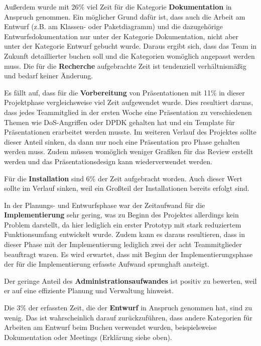 \documentclass[../review_2.tex]{subfiles}
\begin{document}
Außerdem wurde mit 26\% viel Zeit für die Kategorie \textbf{Dokumentation} in Anspruch genommen. Ein möglicher Grund dafür ist, dass auch die Arbeit am Entwurf (z.B. am Klassen- oder Paketdiagramm) und die dazugehörige Entwurfsdokumentation nur unter der Kategorie Dokumentation, nicht aber unter der Kategorie Entwurf gebucht wurde. Daraus ergibt sich, dass das Team in Zukunft detaillierter buchen soll und die Kategorien womöglich angepasst werden muss.
Die für die \textbf{Recherche} aufgebrachte Zeit ist tendenziell verhältnismäßig und bedarf keiner Änderung.

Es fällt auf, dass für die \textbf{Vorbereitung} von Präsentationen  mit 11\% in dieser Projektphase vergleichsweise viel Zeit aufgewendet wurde. Dies resultiert daruas, dass jedes Teammitglied in der ersten Woche eine Präsentation zu verschiedenen Themen wie DoS-Angriffen oder DPDK gehalten hat und ein Template für Präsentationen erarbeitet werden musste. Im weiteren Verlauf des Projektes sollte dieser Anteil sinken, da dann nur noch eine Präsentation pro Phase gehalten werden muss. Zudem müssen womöglich weniger Grafiken für das Review erstellt werden und das Präsentationsdesign kann wiederverwendet werden.

Für die \textbf{Installation} sind 6\% der Zeit aufgebracht worden. Auch dieser Wert sollte im Verlauf sinken, weil ein Großteil der Installationen bereits erfolgt sind.

In der Planungs- und Entwurfsphase war der Zeitaufwand für die \textbf{Implementierung} sehr gering, was zu Beginn des Projektes allerdings kein Problem darstellt, da hier lediglich ein erster Prototyp mit stark reduziertem Funktionsumfang entwickelt wurde. Zudem kann es daraus resultieren, dass in dieser Phase mit der Implementierung lediglich zwei der acht Teammitglieder beauftragt waren. Es wird erwartet, dass mit Beginn der Implementierungsphase  der für die Implementierung erfasste Aufwand sprunghaft ansteigt.

Der geringe Anteil des \textbf{Administrationsaufwandes} ist positiv zu bewerten, weil er auf eine effiziente Planung und Verwaltung hinweist.

Die 3\% der erfassten Zeit, die der \textbf{Entwurf} in Anspruch genommen hat, sind zu wenig. Das ist wahrscheinlich darauf zurückzuführen, dass andere Kategorien für Arbeiten am Entwurf beim Buchen verwendet wurden, beispielsweise Dokumentation oder Meetings (Erklärung siehe oben).
\end{document}
